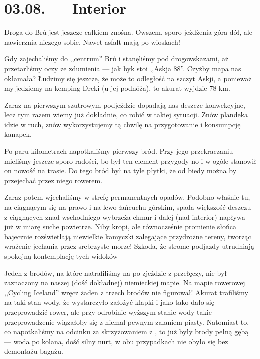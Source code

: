 \chapter*{03.08. --- Interior}

Droga do Brú jest jeszcze całkiem znośna. Owszem, sporo jeżdżenia góra-dół, ale nawierznia niczego sobie. Nawet asfalt mają po wioskach!

Gdy zajechaliśmy do ,,centrum'' Brú i stanęliśmy pod drogowskazami, aż przetarliśmy oczy ze zdumienia --- jak byk stoi ,,Askja 88''. Czyżby mapa nas okłamała? Łudzimy się jeszcze, że może to odległość na szczyt Askji, a ponieważ my jedziemy na kemping Dreki (u jej podnóża), to akurat wyjdzie 78 km.

Zaraz na pierwszym szutrowym podjeździe dopadają nas deszcze konwekcyjne, lecz tym razem wiemy już dokładnie, co robić w takiej sytuacji. Znów plandeka idzie w ruch, znów wykorzystujemy tą chwilę na przygotowanie i konsumpcję kanapek.

Po paru kilometrach napotkaliśmy pierwszy bród. Przy jego przekraczaniu mieliśmy jeszcze sporo radości, bo był ten element przygody no i w ogóle stanowił on nowość na trasie. Do tego bród był na tyle płytki, że od biedy można by przejechać przez niego rowerem.

Zaraz potem wjechaliśmy w strefę permanentnych opadów. Podobno właśnie tu, na ciągnącym się na prawo i na lewo łańcuchu górskim, spada większość deszczu z ciągnących znad wschodniego wybrzeża chmur i dalej (nad interior) napływa już w miarę suche powietrze. Niby kropi, ale równocześnie promienie słońca bajecznie rozświetlają niewielkie kamyczki zalegające przydrożne tereny, tworząc wrażenie jechania przez srebrzyste morze! Szkoda, że strome podjazdy utrudniają spokojną kontemplację tych widoków \wink


Jeden z brodów, na które natrafiliśmy na  po zjeździe z przełęczy, nie był zaznaczony na naszej (dość dokładnej) niemieckiej mapie. Na mapie rowerowej ,,Cycling Iceland'' wręcz żaden z trzech brodów nie figurował! Akurat trafiliśmy na taki stan wody, że wystarczyło założyć klapki i jako tako dało się przeprowadzić rower, ale przy odrobinie wyższym stanie wody takie przeprowadzenie wiązałoby się z niemal pewnym zalaniem piasty. Natomiast to, co napotkaliśmy na odcinku za skrzyżowaniem z , to już były brody pełną gębą --- woda po kolana, dość silny nurt, w obu przypadkach nie obyło się bez demontażu bagażu.

